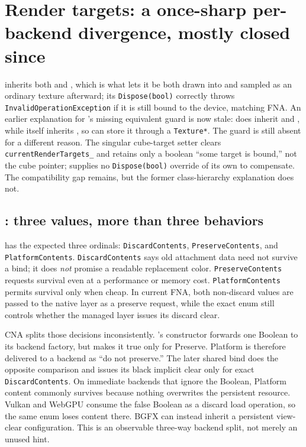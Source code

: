 \section[Render-target divergences]{Render targets: a once-sharp per-backend divergence,
mostly closed since}
\label{sec:rendertargets}

 inherits both  and ,
which is what lets it be both drawn into and sampled as an ordinary texture afterward; its
\texttt{Dispose(bool)} correctly throws \texttt{InvalidOperationException} if it is still
bound to the device, matching FNA. An earlier explanation for
's missing equivalent guard is now stale:
 does inherit  and
, while  itself inherits , so
 can store it through a \texttt{Texture*}. The guard is still
absent for a different reason. The singular cube-target setter clears
\texttt{currentRenderTargets\_} and retains only a boolean ``some target is bound,'' not the
cube pointer;  supplies no \texttt{Dispose(bool)} override of its
own to compensate. The compatibility gap remains, but the former class-hierarchy explanation
does not.

\subsection{: three values, more than three behaviors}
\label{sec:rendertarget-usage-contract}

 has the expected three ordinals:
\texttt{DiscardContents}, \texttt{PreserveContents}, and \texttt{PlatformContents}.
\texttt{DiscardContents} says old attachment data need not survive a bind; it does
\emph{not} promise a readable replacement color. \texttt{PreserveContents} requests survival
even at a performance or memory cost. \texttt{PlatformContents} permits survival only when
cheap. In current FNA, both non-discard values are passed to the native layer as a preserve
request, while the exact enum still controls whether the managed layer issues its discard
clear.

CNA splits those decisions inconsistently. 's constructor forwards
one Boolean to its backend factory, but makes it true only for Preserve. Platform is therefore
delivered to a backend as ``do not preserve.'' The later shared bind does the opposite
comparison and issues
its black implicit clear only for exact \texttt{DiscardContents}. On immediate backends that
ignore the Boolean, Platform content commonly survives because nothing overwrites the
persistent resource. Vulkan and WebGPU consume the false Boolean as a discard load operation,
so the same enum loses content there. BGFX can instead inherit a persistent view-clear
configuration. This is an observable three-way backend split, not merely an unused hint.

